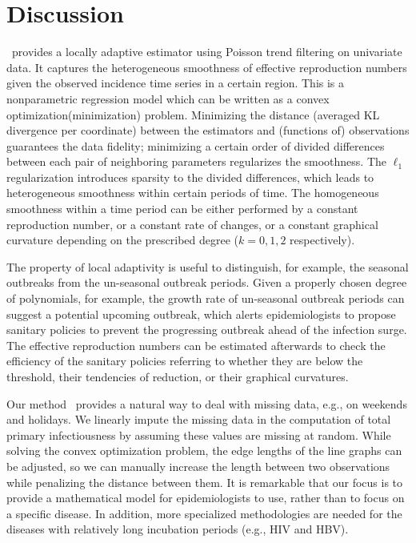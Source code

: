 \section{Discussion}

\RtEstim\ provides a locally adaptive estimator using Poisson trend filtering on univariate data. It captures the heterogeneous smoothness of effective reproduction numbers given the observed incidence time series in a certain region. This is a nonparametric regression model which can be written as a convex optimization(minimization) problem. Minimizing the distance (averaged KL divergence per coordinate) between the estimators and (functions of) observations guarantees the data fidelity; minimizing a certain order of divided differences between each pair of neighboring parameters regularizes the smoothness. The $\ell_1$ regularization introduces sparsity to the divided differences, which leads to heterogeneous smoothness within certain periods of time. The homogeneous smoothness within a time period can be either performed by a constant reproduction number, or a constant rate of changes, or a constant graphical curvature depending on the prescribed degree ($k=0,1,2$ respectively). %

The property of local adaptivity is useful to distinguish, for example, the seasonal outbreaks from the un-seasonal outbreak periods. Given a properly chosen degree of polynomials, for example, the growth rate of un-seasonal outbreak periods can suggest a potential upcoming outbreak, which alerts epidemiologists to propose sanitary policies to prevent the progressing outbreak ahead of the infection surge. The effective reproduction numbers can be estimated afterwards to check the efficiency of the sanitary policies referring to whether they are below the threshold, their tendencies of reduction, or their graphical curvatures.

Our method \RtEstim\ provides a natural way to deal with missing data, e.g., on weekends and holidays. We linearly impute the missing data in the computation of total primary infectiousness by assuming these values are missing at random. 
While solving the convex optimization problem, the edge lengths of the line graphs can be adjusted, so we can manually increase the length between two observations while penalizing the distance between them. 
It is remarkable that our focus is to provide a mathematical model for epidemiologists to use, rather than to focus on a specific disease. In addition, more specialized methodologies are needed for the diseases with relatively long incubation periods (e.g., HIV and HBV). 


